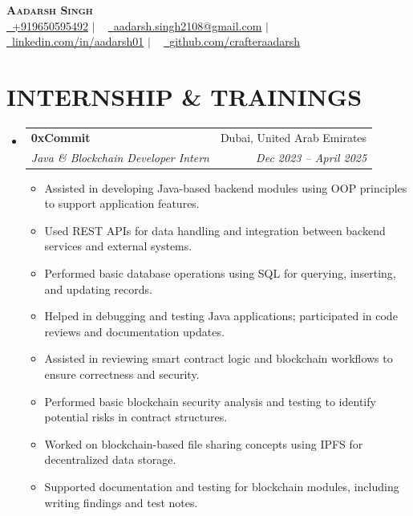 \documentclass[letterpaper,11pt]{article}
\makeatletter
\newcommand{\resumeItem}[1]{
  \item\small{
    {#1 \vspace{-2pt}}
  }
}
\newcommand{\resumeSubheading}[4]{
  \vspace{-2pt}\item
    \begin{tabular*}{0.97\textwidth}[t]{l@{\extracolsep{\fill}}r}
      \textbf{#1} & #2 \\
      \textit{\small#3} & \textit{\small #4} \\
    \end{tabular*}\vspace{-7pt}
}
\newcommand{\resumeSubHeadingListStart}{\begin{itemize}[leftmargin=0.15in, label={}]}
\newcommand{\resumeSubHeadingListEnd}{\end{itemize}}
\newcommand{\resumeItemListStart}{\begin{itemize}}
\newcommand{\resumeItemListEnd}{\end{itemize}\vspace{-5pt}}
\makeatother
\begin{document}
\begin{center}
    {\Huge \textbf{\textsc{Aadarsh Singh}}} \\ \vspace{1pt}
    \small
    \href{tel:+919650595492}{{\color{phonecolor}\faPhone}\ {+919650595492}} $|$ ~
    \href{mailto:aadarsh.singh2108@gmail.com}{{\color{emailcolor}\faEnvelope}\ {aadarsh.singh2108@gmail.com}} $|$ ~
    \href{https://www.linkedin.com/in/aadarsh01}{{\color{linkedincolor}\faLinkedinSquare}\ {linkedin.com/in/aadarsh01}} $|$ ~
    \href{https://github.com/crafteraadarsh}{{\color{githubcolor}\faGithub}\ {github.com/crafteraadarsh}}
\end{center}

\section{\textbf{\MakeUppercase{INTERNSHIP \& TRAININGS}}}
  \resumeSubHeadingListStart
    \resumeSubheading
      {0xCommit}{Dubai, United Arab Emirates}
      {Java \& Blockchain Developer Intern}{Dec 2023 -- April 2025}
      \resumeItemListStart
        \resumeItem{Assisted in developing Java-based backend modules using OOP principles to support application features.}
        \resumeItem{Used REST APIs for data handling and integration between backend services and external systems.}
        \resumeItem{Performed basic database operations using SQL for querying, inserting, and updating records.}
        \resumeItem{Helped in debugging and testing Java applications; participated in code reviews and documentation updates.}
        \resumeItem{Assisted in reviewing smart contract logic and blockchain workflows to ensure correctness and security.}
        \resumeItem{Performed basic blockchain security analysis and testing to identify potential risks in contract structures.}
        \resumeItem{Worked on blockchain-based file sharing concepts using IPFS for decentralized data storage.}
        \resumeItem{Supported documentation and testing for blockchain modules, including writing findings and test notes.}
      \resumeItemListEnd
  \resumeSubHeadingListEnd

\end{document}
